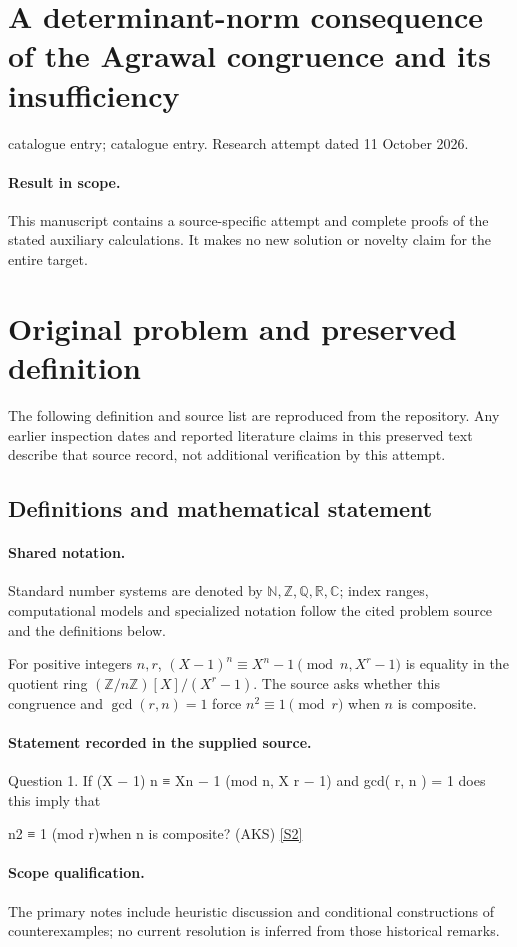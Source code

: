 \documentclass[11pt]{article}
\begin{document}
\section*{A determinant-norm consequence of the Agrawal congruence and its insufficiency}
\noindent catalogue entry; catalogue entry. Research attempt dated 11 October 2026.
\paragraph{Result in scope.}This manuscript contains a source-specific attempt and complete proofs of the stated auxiliary calculations. It makes no new solution or novelty claim for the entire target.
\section{Original problem and preserved definition}
The following definition and source list are reproduced from the repository. Any earlier inspection dates and reported literature claims in this preserved text describe that source record, not additional verification by this attempt.
\subsection{Definitions and mathematical statement}

\paragraph{Shared notation.}Standard number systems are denoted by $\mathbb N,\mathbb Z,\mathbb Q,\mathbb R,\mathbb C$; index ranges, computational models and specialized notation follow the cited problem source and the definitions below.


For positive integers $n,r$, $(X-1)^n\equiv X^n-1\pmod{n,X^r-1}$ is equality in the quotient ring $(\mathbb Z/n\mathbb Z)[X]/(X^r-1)$. The source asks whether this congruence and $\gcd(r,n)=1$ force $n^2\equiv1\pmod r$ when $n$ is composite.
\paragraph{Statement recorded in the supplied source.}
Question 1. If (X − 1) n ≡ Xn − 1 (mod n, X r − 1) and gcd( r, n ) = 1 does this imply that

n2 ≡ 1 (mod r)when n is composite? (AKS) \href{https://aimath.org/WWN/primesinp/primesinp.pdf}{[S2]}
\paragraph{Scope qualification.}
The primary notes include heuristic discussion and conditional constructions of counterexamples; no current resolution is inferred from those historical remarks.
\end{document}
